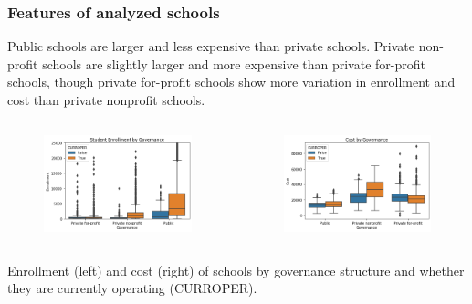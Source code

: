 \documentclass{beamer}
\begin{document}
\begin{frame} 
\frametitle{Features of analyzed schools}
Public schools are larger and less expensive than private schools. Private non-profit schools are slightly larger and more expensive than private for-profit schools, though private for-profit schools show more variation in enrollment and cost than private nonprofit schools.

\begin{columns}
\column{2in}
\begin{figure}
\includegraphics[width=2in]{currentUGDSControlBox.png}
\end{figure}

\column{2in}
\begin{figure}
\includegraphics[width=2in]{currentCostGovBox.png}
\end{figure}
\end{columns}
\begin{center}
Enrollment (left) and cost (right) of schools by governance structure and whether they are currently operating (CURROPER).  \end{center}
\end{frame}
\end{document}
